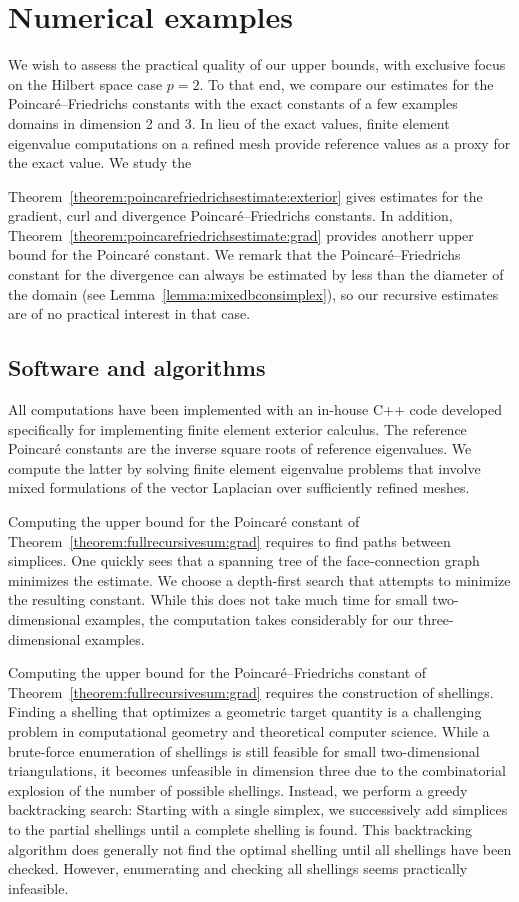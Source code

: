 \documentclass[10pt,a4paper]{article}
\begin{document}
\section{Numerical examples}\label{section:numericalexamples}

We wish to assess the practical quality of our upper bounds, with exclusive focus on the Hilbert space case $p=2$. 
To that end, we compare our estimates for the Poincar\'e--Friedrichs constants with the exact constants of a few examples domains in dimension 2 and 3. 
In lieu of the exact values, finite element eigenvalue computations on a refined mesh provide reference values as a proxy for the exact value.
We study the 

Theorem~\ref{theorem:poincarefriedrichsestimate:exterior} gives estimates for the gradient, curl and divergence Poincar\'e--Friedrichs constants. 
In addition, Theorem~\ref{theorem:poincarefriedrichsestimate:grad} provides anotherr upper bound for the Poincar\'e constant.
We remark that the Poincar\'e--Friedrichs constant for the divergence can always be estimated by less than the diameter of the domain (see Lemma~\ref{lemma:mixedbconsimplex}), so our recursive estimates are of no practical interest in that case. 

\subsection{Software and algorithms}

All computations have been implemented with an in-house C++ code developed specifically for implementing finite element exterior calculus. 
The reference Poincar\'e constants are the inverse square roots of reference eigenvalues.
We compute the latter by solving finite element eigenvalue problems that involve mixed formulations of the vector Laplacian over sufficiently refined meshes. 

Computing the upper bound for the Poincar\'e constant of Theorem~\ref{theorem:fullrecursivesum:grad} requires to find paths between simplices. One quickly sees that a spanning tree of the face-connection graph minimizes the estimate. 
We choose a depth-first search that attempts to minimize the resulting constant. 
While this does not take much time for small two-dimensional examples, the computation takes considerably for our three-dimensional examples. 

Computing the upper bound for the Poincar\'e--Friedrichs constant of Theorem~\ref{theorem:fullrecursivesum:grad} requires the construction of shellings. 
Finding a shelling that optimizes a geometric target quantity is a challenging problem in computational geometry and theoretical computer science. 
While a brute-force enumeration of shellings is still feasible for small two-dimensional triangulations, it becomes unfeasible in dimension three due to the combinatorial explosion of the number of possible shellings. 
Instead, we perform a greedy backtracking search: 
Starting with a single simplex, we successively add simplices to the partial shellings until a complete shelling is found. 
This backtracking algorithm does generally not find the optimal shelling until all shellings have been checked.
However, enumerating and checking all shellings seems practically infeasible. 
\end{document}
